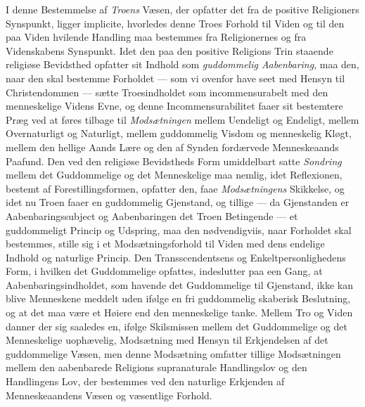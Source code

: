 \documentclass[12pt,a4paper]{book}
\newcommand{\opage}[1]{\marginnote{\footnotesize\textit{[#1]}}}
\begin{document}
I denne Bestemmelse af \emph{Troens} Væsen, der opfatter det fra de positive
Religioners Synspunkt, ligger implicite, hvorledes denne Troes Forhold til Viden
og til den paa Viden hvilende Handling maa bestemmes fra Religionernes og fra
Videnskabens Synspunkt. Idet den paa den positive Religions Trin staaende
religiøse Bevidsthed opfatter sit Indhold som \emph{guddommelig Aabenbaring}, maa
den, naar den skal bestemme Forholdet --- som vi ovenfor have seet med Hensyn til
Christendommen --- sætte Troesindholdet som incommensurabelt med den menneskelige
Videns Evne, og denne Incommensurabilitet faaer sit bestemtere Præg ved at føres
tilbage til \emph{Modsætningen} mellem Uendeligt og Endeligt, mellem Overnaturligt og
Naturligt, mellem guddommelig Visdom og menneskelig Kløgt, mellem den hellige
Aands Lære og den af Synden fordærvede Menneskeaands Paafund. Den ved den
religiøse Bevidstheds Form umiddelbart satte \emph{Sondring} mellem det Guddommelige og
det Menneskelige maa nemlig, idet Reflexionen, bestemt af Forestillingsformen,
opfatter den, faae \emph{Modsætningens} Skikkelse, og idet nu Troen faaer en guddommelig
Gjenstand, og tillige --- da Gjenstanden er Aabenbaringssubject og Aabenbaringen
det Troen Betingende --- et guddommeligt Princip og Udspring, maa den
nødvendigviis, naar Forholdet skal bestemmes, stille sig i et Modsætningsforhold
til Viden med dens endelige Indhold og naturlige Princip. Den Transscendentsens
og Enkeltpersonlighedens Form, i hvilken det Guddommelige opfattes, indeslutter
paa een Gang, at Aabenbaringsindholdet, som havende det Guddommelige til
Gjenstand, ikke kan blive Menneskene meddelt uden ifølge en fri guddommelig
skaberisk Beslutning, og at det maa være et Høiere end den menneskelige tanke.
Mellem Tro og Viden danner der sig saaledes en, ifølge Skilsmissen mellem det
Guddommelige og det Menneskelige \opage{41}uophævelig, Modsætning med Hensyn til
Erkjendelsen af det guddommelige Væsen, men denne Modsætning omfatter tillige
Modsætningen mellem den aabenbarede Religions supranaturale Handlingslov og den
Handlingens Lov, der bestemmes ved den naturlige Erkjenden af Menneskeaandens
Væsen og væsentlige Forhold.
\end{document}
